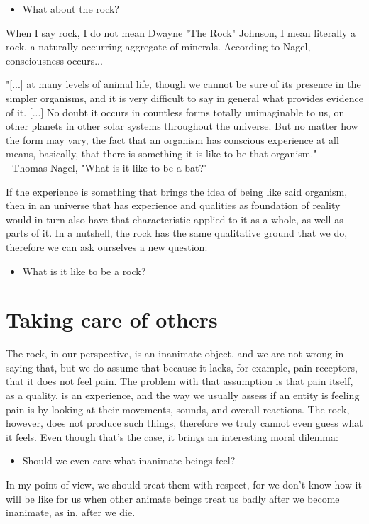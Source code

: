 \begin{itemize}
    \item What about the rock?
\end{itemize}

When I say rock, I do not mean Dwayne "The Rock" Johnson, I mean literally a rock, a naturally
occurring aggregate of minerals. According to Nagel, consciousness occurs...

\begin{center}
    \itshape
    \parbox{0.7\textwidth}{
    "[...] at many levels of animal life, though we cannot be sure of its presence in the simpler
    organisms, and it is very difficult to say in general what provides evidence of it. [...] No
    doubt it occurs in countless forms totally unimaginable to us, on other planets in other
    solar systems throughout the universe. But no matter how the form may vary, the fact that an
    organism has conscious experience at all means, basically, that there is something it is like
    to be that organism."\\
    \normalfont - Thomas Nagel, "What is it like to be a bat?" \cite{Nagel2024}
    }
\end{center}

If the experience is something that brings the idea of being like said organism, then in an universe
that has experience and qualities as foundation of reality would in turn also have that characteristic
applied to it as a whole, as well as parts of it. In a nutshell, the rock has the same qualitative
ground that we do, therefore we can ask ourselves a new question:

\begin{itemize}
    \item What is it like to be a rock?
\end{itemize}

\section{Taking care of others}
The rock, in our perspective, is an inanimate object, and we are not wrong in saying that, but we
do assume that because it lacks, for example, pain receptors, that it does not feel pain. The
problem with that assumption is that pain itself, as a quality, is an experience, and the way we
usually assess if an entity is feeling pain is by looking at their movements, sounds, and overall
reactions. The rock, however, does not produce such things, therefore we truly cannot even guess
what it feels. Even though that's the case, it brings an interesting moral dilemma:

\begin{itemize}
    \item Should we even care what inanimate beings feel?
\end{itemize}

In my point of view, we should treat them with respect, for we don't know how it will be like for us
when other animate beings treat us badly after we become inanimate, as in, after we die.